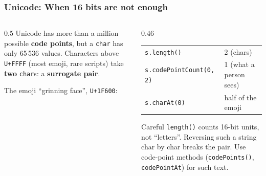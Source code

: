 \documentclass[aspectratio=169,10pt,compress]{beamer}
\begin{document}
\begin{frame}[t,fragile] \frametitle{Unicode: When 16 bits are not enough}
  \begin{columns}[T]
    \begin{column}{0.5\textwidth}
      \small Unicode has more than a million possible \textbf{code points}, but a \texttt{char} has only 65\,536 values.
      Characters above \texttt{U+FFFF} (most emoji, rare scripts) take \textbf{two} \texttt{char}s:
      a \textbf{surrogate pair}.

      \vspace{0.5em}
      The emoji ``grinning face'', \texttt{U+1F600}:
      \begin{center}
      \end{center}
    \end{column}
    \begin{column}{0.46\textwidth}
      \footnotesize
      \begin{tabular}{@{}ll@{}}
        \toprule
        \texttt{s.length()}            & 2 (chars) \\
        \texttt{s.codePointCount(0, 2)} & 1 (what a person sees) \\
        \texttt{s.charAt(0)}           & half of the emoji \\
        \bottomrule
      \end{tabular}

      \vspace{0.6em}
      \begin{alertblock}{Careful}
        \small \texttt{length()} counts 16-bit units, not ``letters''. Reversing such a string
        char by char breaks the pair. Use code-point methods (\texttt{codePoints()}, \texttt{codePointAt}) for such text.
      \end{alertblock}
    \end{column}
  \end{columns}
\end{frame}





\end{document}
